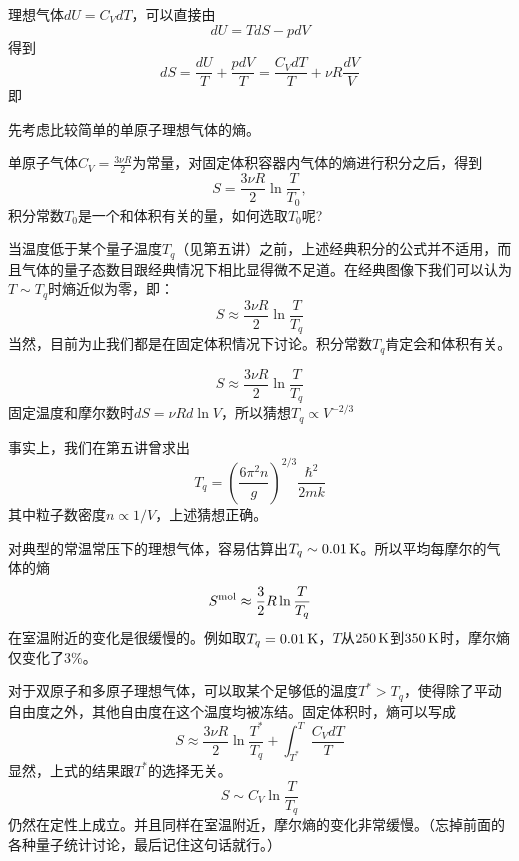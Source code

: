 \documentclass[CJK]{beamer}
\begin{document}
\begin{frame}
  \bch
  理想气体$dU = C_V dT$，可以直接由
  $$ dU = TdS - pdV$$
  得到
  $$ dS = \frac{dU}{T} + \frac{pdV}{T} = \frac{C_VdT}{T} + \nu R\frac{dV}{V}$$
  即
  \ech
\end{frame}

\begin{frame}
  \bch
  先考虑比较简单的单原子理想气体的熵。

  
  单原子气体$C_V=\frac{3\nu R}{2}$为常量，对固定体积容器内气体的熵进行积分之后，得到
  $$ S  = \frac{3\nu R}{2} \ln\frac{T}{T_0}, $$
  积分常数$T_0$是一个和体积有关的量，如何选取$T_0$呢?
  
  当温度低于某个量子温度$T_q$（见第五讲）之前，上述经典积分的公式并不适用，而且气体的量子态数目跟经典情况下相比显得微不足道。在经典图像下我们可以认为$T\sim T_q$时熵近似为零，即：
  $$S \approx \frac{3\nu R}{2} \ln\frac{T}{T_q}$$
  当然，目前为止我们都是在固定体积情况下讨论。积分常数$T_q$肯定会和体积有关。
   
  \ech
\end{frame}

\begin{frame}
  \bch
  $$S \approx \frac{3\nu R}{2} \ln\frac{T}{T_q}$$  
  固定温度和摩尔数时$dS = \nu R d\ln V$，所以猜想$T_q \propto V^{-2/3}$

  事实上，我们在第五讲曾求出
  $$T_q = \left(\frac{6\pi^2 n}{ g}\right)^{2/3} \frac{\hbar^2}{2mk}$$
  其中粒子数密度$n\propto 1/V$，上述猜想正确。

  对典型的常温常压下的理想气体，容易估算出$T_q\sim 0.01\,\mathrm{K}$。所以平均每摩尔的气体的熵
  $$S^{\rm mol} \approx \frac{3}{2}R\ln\frac{T}{T_q}$$
  在室温附近的变化是很缓慢的。例如取$T_q = 0.01\,\mathrm{K}$，$T$从$250\,\mathrm{K}$到$350\,\mathrm{K}$时，摩尔熵仅变化了$3\%$。
  \ech
\end{frame}


\begin{frame}
  \bch
  对于双原子和多原子理想气体，可以取某个足够低的温度$T^*> T_q$，使得除了平动自由度之外，其他自由度在这个温度均被冻结。固定体积时，熵可以写成
  $$S \approx \frac{3\nu R}{2} \ln\frac{T^*}{T_q} + \int_{T^*}^T \frac{C_VdT}{T}$$
  显然，上式的结果跟$T^*$的选择无关。
  $$ S \sim C_V\ln\frac{T}{T_q}$$
  仍然在定性上成立。并且同样{\blue 在室温附近，摩尔熵的变化非常缓慢}。（忘掉前面的各种量子统计讨论，最后记住这句话就行。）
  \ech
\end{frame}
\end{document}
